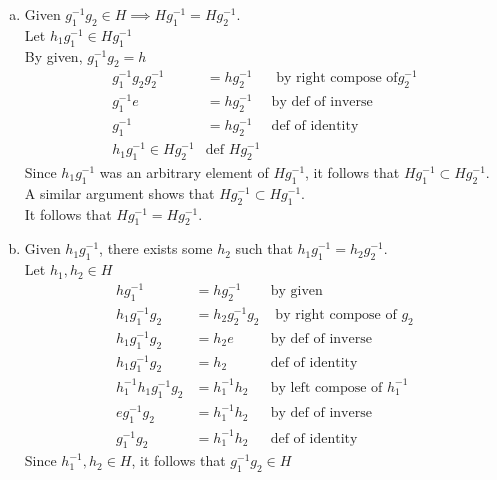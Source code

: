\begin{enumerate}[(a)]
\item
Given $g_1^{-1}g_2 \in H \implies Hg_1^{-1} = Hg_2^{-1}$.
\\
Let $h_1g_1^{-1} \in Hg_1^{-1}$
\\
By given, $g_1^{-1}g_2 = h$
\begin{align*}
g_1^{-1}g_2g_2^{-1} &= hg_2^{-1} &\text{ by right compose of} g_2^{-1}
\\
g_1^{-1}e &= hg_2^{-1} &\text{by def of inverse}
\\
g_1^{-1} &= hg_2^{-1} &\text{def of identity}
\\
h_1 g_1^{-1} \in H g_2^{-1} &\text{def\ } H g_2^{-1}
\end{align*}
Since $h_1 g_1^{-1}$ was an arbitrary element of $H g_1^{-1}$, it follows that $H g_1^{-1} \subset H g_2^{-1}$.
\\
A similar argument shows that $H g_2^{-1} \subset H g_1^{-1}$.
\\
It follows that $H g_1^{-1} = H g_2^{-1}$.

\item
Given $h_1 g_1^{-1}$, there exists some $h_2$ such that $h_1 g_1^{-1} = h_2 g_2^{-1}$.
\\
Let $h_1, h_2 \in H$
\begin{align*}
hg_1^{-1} &= h g_2^{-1} &\text{by given}
\\
h_1g_1^{-1}g_2 &= h_2g_2^{-1}g_2 &\text{ by right compose of\ } g_2
\\
h_1g_1^{-1}g_2 &= h_2e &\text{by def of inverse}
\\
h_1g_1^{-1}g_2 &= h_2 &\text{def of identity}
\\
h_1^{-1}h_1g_1^{-1}g_2 &= h_1^{-1}h_2  &\text{by left compose of\ } h_1^{-1}
\\
eg_1^{-1}g_2 &= h_1^{-1}h_2 &\text{by def of inverse}
\\
g_1^{-1}g_2 &= h_1^{-1}h_2 &\text{def of identity}
\end{align*}
Since $h_1^{-1}, h_2 \in H$, it follows that $g_1^{-1}g_2 \in H$
\end{enumerate}

